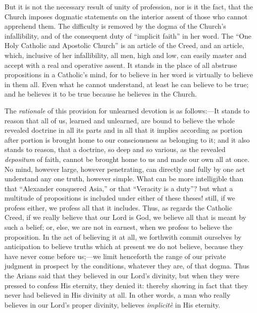 But it is not the necessary result of unity of profession, nor is
it the fact, that the Church imposes dogmatic statements on the
interior assent of those who cannot apprehend them. The difficulty is
removed by the dogma of the Church's infallibility, and of the
consequent duty of ``implicit faith'' in her word. The
``One Holy Catholic and Apostolic Church'' is an article of
the Creed, and an article, which, inclusive of her infallibility, all
men, high and low, can easily master and accept with a real and
operative assent. It stands in the place of all abstruse propositions
in a Catholic's mind, for to believe in her word is virtually to
believe in them all. Even what he cannot understand, at least he can
believe to be true; and he believes it to be true because he believes
in the Church.

The \emph{rationale} of this provision for unlearned devotion is as
follows:—It stands to reason that all of us, learned and unlearned,
are bound to believe the whole revealed doctrine in all its parts and
in all that it implies according as portion after portion is brought
home to our consciousness as belonging to it; and it also stands to
reason, that a doctrine, so deep and so various, as the revealed \emph{depositum}
of faith, cannot be brought home to us and made our own all at once.
No mind, however large, however penetrating, can directly and fully by
one act understand any one truth, however simple. What can be more
intelligible than that ``Alexander conquered Asia,'' or that
``Veracity is a duty''? but what a multitude of propositions
is included under either of these theses! still, if we profess either,
we profess all that it includes. Thus, as regards the Catholic Creed,
if we really believe that our Lord is God, we believe all that is
meant by such a belief; or, else, we are not in earnest, when we
profess to believe the proposition. In the act of believing it at all,
we forthwith commit ourselves by anticipation to believe truths which
at present we do not believe, because they have never come before us;—we
limit henceforth the range of our private judgment in prospect by the
conditions, whatever they are, of that dogma. Thus the Arians said
that they believed in our Lord's divinity, but when they were pressed
to confess His eternity, they denied it: thereby showing in fact that
they never had believed in His divinity at all. In other words, a man
who really believes in our Lord's proper divinity, believes \emph{implicitè}
in His eternity.


